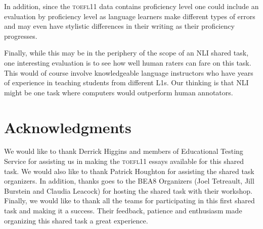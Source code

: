 \documentclass[11pt,letterpaper]{article}
\begin{document}
In addition, since the \textsc{toefl11} data contains proficiency level
one could include an evaluation by
proficiency level
as language learners make different types of errors
and may even have stylistic differences in their writing as their
proficiency progresses.

Finally, while this may be in the periphery of the scope of an
NLI shared task, one interesting evaluation is to see how well
human raters can fare on this task.  This would of course involve
knowledgeable language instructors who have years of experience
in teaching students from different L1s.  Our thinking is that NLI
might be one task where computers would outperform human annotators.

\section*{Acknowledgments}
We would like to thank Derrick Higgins and members of Educational
Testing Service for assisting us in making the \textsc{toefl11} essays
available for this shared task.  We would also like to thank
Patrick Houghton for assisting the shared task organizers.
In addition, thanks goes to the BEA8 Organizers (Joel Tetreault,
Jill Burstein and Claudia Leacock) for hosting the shared
task with their workshop.  Finally, we would like to thank all the teams for
participating in this first shared task and making it a success.
Their feedback, patience and enthusiasm made organizing this
shared task a great experience.








\appendix
\end{document}
